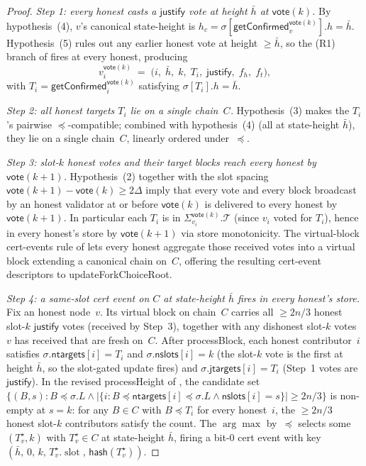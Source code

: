 \ifx\litemode\undefined\documentclass{article}\fi
\newcommand{\slot}[0]{\ensuremath{\operatorname{\mathrm{slot}}}}
\newcommand{\just}{\ensuremath{\mathsf{justify}}\xspace}
\newcommand{\jtargets}{\mathsf{jtargets}}
\newcommand{\ntargets}{\mathsf{ntargets}}
\newcommand{\nslots}{\mathsf{nslots}}
\newcommand{\hash}{\mathsf{hash}}
\newcommand{\vote}{\mathsf{vote}}
\newcommand{\comm}[1]{\bar{#1}}
\newcommand{\processBlock}{\textsf{processBlock}\xspace}
\newcommand{\processHeight}{\textsf{processHeight}\xspace}
\newcommand{\updateForkChoiceRoot}{\textsf{updateForkChoiceRoot}\xspace}
\newcommand{\getConfirmed}{\textsf{getConfirmed}\xspace}
\theoremstyle{plain}
\theoremstyle{definition}
\theoremstyle{remark}
\begin{document}
\begin{proof}
\emph{Step 1: every honest casts a \just vote at height $\comm{h}$ at $\vote(k)$.}
By hypothesis~(4), $v$'s canonical state-height is $h_c = \sigma[\getConfirmed_v^{\vote(k)}].h = \comm{h}$.
Hypothesis~(5) rules out any earlier honest vote at height $\geq \comm{h}$, so the (R1) branch of  fires at every honest, producing
\[
  v^{\vote(k)}_i \;=\; \bigl(i,\; \comm{h},\; k,\; T_i,\; \just,\; f_h,\; f_t\bigr),
\]
with $T_i = \getConfirmed_i^{\vote(k)}$ satisfying $\sigma[T_i].h = \comm{h}$.

\emph{Step 2: all honest targets $T_i$ lie on a single chain~$C$.}
Hypothesis~(3) makes the $T_i$'s pairwise $\preceq$-compatible; combined with hypothesis~(4) (all at state-height $\comm{h}$), they lie on a single chain~$C$, linearly ordered under~$\preceq$.

\emph{Step 3: slot-$k$ honest votes and their target blocks reach every honest by $\vote(k+1)$.}
Hypothesis~(2) together with the slot spacing $\vote(k+1) - \vote(k) \geq 2\Delta$ imply that every vote and every block broadcast by an honest validator at or before $\vote(k)$ is delivered to every honest by $\vote(k+1)$.
In particular each $T_i$ is in $\Sigma_{v_i}^{\vote(k)}.\mathcal{T}$ (since $v_i$ voted for $T_i$), hence in every honest's store by $\vote(k+1)$ via store monotonicity.
The virtual-block cert-events rule of  lets every honest aggregate those received votes into a virtual block extending a canonical chain on~$C$, offering the resulting cert-event descriptors to \updateForkChoiceRoot.

\emph{Step 4: a same-slot cert event on $C$ at state-height $\comm{h}$ fires in every honest's store.}
Fix an honest node~$v$. Its virtual block on chain~$C$ carries all $\geq 2n/3$ honest slot-$k$ \just votes (received by Step~3), together with any dishonest slot-$k$ votes $v$ has received that are fresh on~$C$.
After \processBlock{}, each honest contributor~$i$ satisfies $\sigma.\ntargets[i] = T_i$ and $\sigma.\nslots[i] = k$ (the slot-$k$ vote is the first at height $\comm{h}$, so the slot-gated update fires) and $\sigma.\jtargets[i] = T_i$ (Step~1 votes are \just).
In the revised \processHeight{} of , the candidate set $\{(B, s) : B \preceq \sigma.L \wedge |\{i : B \preceq \ntargets[i] \preceq \sigma.L \wedge \nslots[i] = s\}| \geq 2n/3\}$ is non-empty at $s = k$: for any $B \in C$ with $B \preceq T_i$ for every honest~$i$, the $\geq 2n/3$ honest slot-$k$ contributors satisfy the count. The $\arg\max$ by~$\preceq$ selects some $(T^\star_v, k)$ with $T^\star_v \in C$ at state-height $\comm{h}$, firing a bit-$0$ cert event with key $(\comm{h},\, 0,\, k,\, T^\star_v.\slot,\, \hash(T^\star_v))$.


\end{proof}
\end{document}
